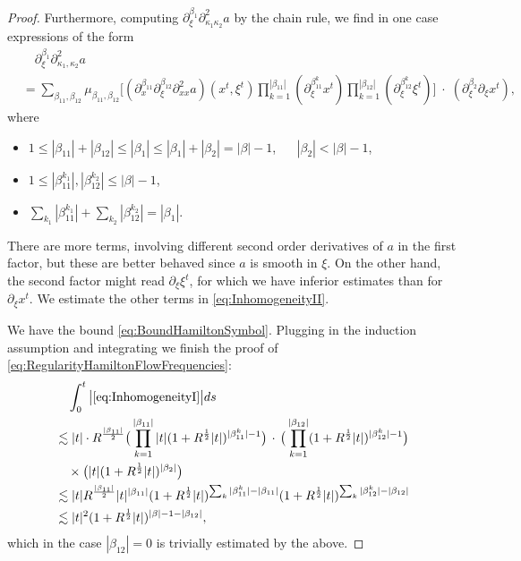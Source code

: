 \documentclass{amsart}
\theoremstyle{definition}
\begin{document}
\begin{proof}
Furthermore, computing $\partial_{\xi}^{\beta_1} \partial^2_{\kappa_1 \kappa_2} a$ by the chain rule, we find in one case expressions of the form
\begin{equation}
\label{eq:InhomogeneityI}
\begin{split}
&\quad \partial_{\xi}^{\beta_1} \partial^2_{\kappa_1,\kappa_2} a \\
&= \sum_{\beta_{11},\beta_{12}} \mu_{\beta_{11},\beta_{12}} \big[ (\partial^{\beta_{11}}_x \partial^{\beta_{12}}_{\xi} \partial^2_{xx} a)(x^t,\xi^t) \prod_{k=1}^{|\beta_{11}|} (\partial_{\xi}^{\beta_{11}^k} x^t) \prod_{k=1}^{|\beta_{12}|} (\partial_{\xi}^{\beta_{12}^k} \xi^t) \big] \; \cdot \; (\partial_{\xi}^{\beta_2} \partial_{\xi} x^t),
\end{split}
\end{equation}
where 
\begin{itemize}
\item $1 \leq |\beta_{11}| + |\beta_{12}| \leq |\beta_1| \leq |\beta_1|+|\beta_2| = |\beta|-1$, $\quad$ $|\beta_2| < |\beta|-1$,
\item  $1 \leq |\beta_{11}^{k_1}|,|\beta_{12}^{k_2}| \leq |\beta| - 1$, 
\item $\sum_{k_1} |\beta_{11}^{k_1}| + \sum_{k_2} |\beta_{12}^{k_2}| = |\beta_1|$.
\end{itemize} 

There are more terms, involving different second order derivatives of $a$ in the first factor, but these are better behaved since $a$ is smooth in $\xi$. On the other hand, the second factor might read $\partial_{\xi} \xi^t$, for which we have inferior estimates than for $\partial_{\xi} x^t$. We estimate the other terms in \eqref{eq:InhomogeneityII}.

\smallskip

 We have the bound \eqref{eq:BoundHamiltonSymbol}. Plugging in the induction assumption and integrating we finish the proof of \eqref{eq:RegularityHamiltonFlowFrequencies}:
\begin{equation*}
\begin{split}
&\quad \int_0^t \big| \eqref{eq:InhomogeneityI} \big| ds \\
&\lesssim |t| \cdot  R^{\frac{|\beta_{11}|}{2}} \big( \prod_{k=1}^{|\beta_{11}|}  |t| (1+R^{\frac{1}{2}} |t|)^{|\beta_{11}^{k}| - 1} \big) \, \cdot \, \big( \prod_{k=1}^{|\beta_{12}|} (1+ R^{\frac{1}{2}} |t|)^{|\beta_{12}^k| - 1} \big) \\ 
&\quad \times \big( |t| (1+R^{\frac{1}{2}} |t|)^{|\beta_2| } \big) \\
&\lesssim |t| R^{\frac{|\beta_{11}|}{2}} |t|^{|\beta_{11}|} (1+ R^{\frac{1}{2}}|t|)^{\sum_k |\beta_{11}^k| - |\beta_{11}|} (1+ R^{\frac{1}{2}} |t|)^{\sum_k |\beta_{12}^k| - |\beta_{12}|} \\
&\lesssim |t|^2 (1+ R^{\frac{1}{2}} |t|)^{|\beta| -1 - |\beta_{12}|},
\end{split}
\end{equation*}
which in the case $|\beta_{12}| = 0$ is trivially estimated by the above.


\end{proof}
\end{document}
